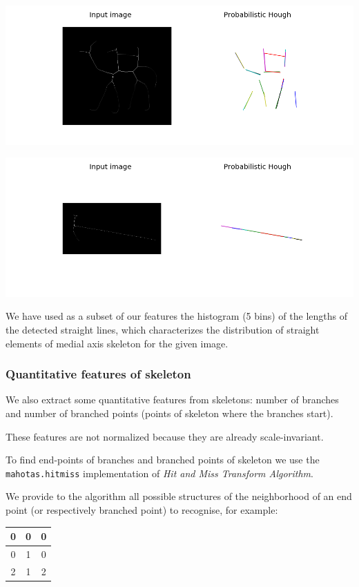 \documentclass[12pt]{article}
\begin{document}
\includegraphics[scale=0.6]{camel_764.png}
\vspace{12px}

\includegraphics[scale=0.6]{hammer_604.png}

We have used as a subset of our features the histogram (5 bins) of the lengths of the detected straight lines, which characterizes the distribution of straight elements of medial axis skeleton for the given image.

\subsubsection{Quantitative features of skeleton}

We also extract some quantitative features from skeletons: number of branches and number of branched points (points of skeleton where the branches start).

These features are not normalized because they are already scale-invariant.

To find end-points of branches and branched points of skeleton we use the \texttt{mahotas.hitmiss} implementation of \textit{Hit and Miss Transform Algorithm}.

We provide to the algorithm all possible structures of the neighborhood of an end point (or respectively branched point) to recognise, for example:

\begin{center}
 	\begin{tabular}{| c | c | c |}
 		\hline
		0 & 0 & 0 \\ \hline
		0 & 1 & 0 \\ \hline
		2 & 1 & 2 \\ \hline
	\end{tabular}
\end{center}
\end{document}
